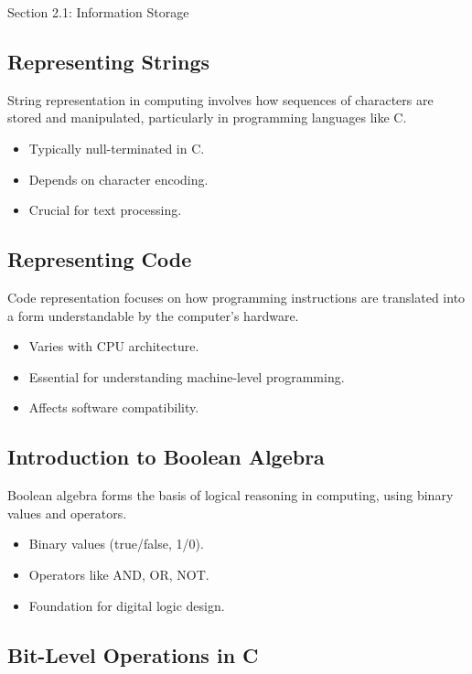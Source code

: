 \begin{notes}{Section 2.1: Information Storage}
    \subsection*{Representing Strings}

    String representation in computing involves how sequences of characters are stored and manipulated, particularly in programming languages like C.

    \begin{itemize}
        \item Typically null-terminated in C.
        \item Depends on character encoding.
        \item Crucial for text processing.
    \end{itemize}
    
    \subsection*{Representing Code}

    Code representation focuses on how programming instructions are translated into a form understandable by the computer's hardware.

    \begin{itemize}
        \item Varies with CPU architecture.
        \item Essential for understanding machine-level programming.
        \item Affects software compatibility.
    \end{itemize}
    
    \subsection*{Introduction to Boolean Algebra}

    Boolean algebra forms the basis of logical reasoning in computing, using binary values and operators.

    \begin{itemize}
        \item Binary values (true/false, 1/0).
        \item Operators like AND, OR, NOT.
        \item Foundation for digital logic design.
    \end{itemize}
    
    \subsection*{Bit-Level Operations in C}


\end{notes}
